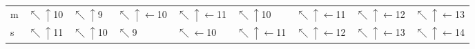 \begin{tabular}{lllllllll}
m &    $\nwarrow\uparrow$10 &     $\nwarrow\uparrow$9 &  $\nwarrow\uparrow\leftarrow$10 &  $\nwarrow\uparrow\leftarrow$11 &            $\nwarrow\uparrow$10 &  $\nwarrow\uparrow\leftarrow$11 &  $\nwarrow\uparrow\leftarrow$12 &  $\nwarrow\uparrow\leftarrow$13 \\
s &    $\nwarrow\uparrow$11 &    $\nwarrow\uparrow$10 &                     $\nwarrow$9 &          $\nwarrow\leftarrow$10 &  $\nwarrow\uparrow\leftarrow$11 &  $\nwarrow\uparrow\leftarrow$12 &  $\nwarrow\uparrow\leftarrow$13 &  $\nwarrow\uparrow\leftarrow$14 \\
\bottomrule
\end{tabular}
